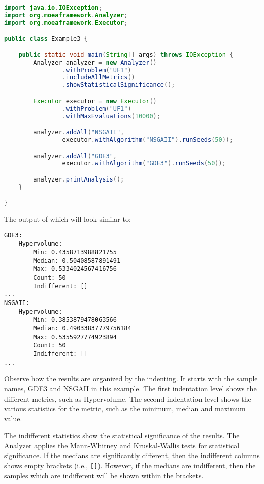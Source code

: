 \begin{lstlisting}[language=Java]
import java.io.IOException;
import org.moeaframework.Analyzer;
import org.moeaframework.Executor;

public class Example3 {

	public static void main(String[] args) throws IOException {
		Analyzer analyzer = new Analyzer()
				.withProblem("UF1")
				.includeAllMetrics()
				.showStatisticalSignificance();

		Executor executor = new Executor()
				.withProblem("UF1")
				.withMaxEvaluations(10000);

		analyzer.addAll("NSGAII",  
				executor.withAlgorithm("NSGAII").runSeeds(50));

		analyzer.addAll("GDE3",
				executor.withAlgorithm("GDE3").runSeeds(50));

		analyzer.printAnalysis();
	}

}
\end{lstlisting}

The output of which will look similar to:

\begin{lstlisting}[language=Plaintext]
GDE3:
    Hypervolume:
        Min: 0.4358713988821755
        Median: 0.50408587891491
        Max: 0.5334024567416756
        Count: 50
        Indifferent: []
...
NSGAII:
    Hypervolume:
        Min: 0.3853879478063566
        Median: 0.49033837779756184
        Max: 0.5355927774923894
        Count: 50
        Indifferent: []
...
\end{lstlisting}

Observe how the results are organized by the indenting.  It starts with the sample names, GDE3 and NSGAII in this example.  The first indentation level shows the different metrics, such as Hypervolume.  The second indentation level shows the various statistics for the metric, such as the minimum, median and maximum value.

The indifferent statistics show the statistical significance of the results.  The Analyzer applies the Mann-Whitney and Kruskal-Wallis tests for statistical significance.  If the medians are significantly different, then the indifferent columns shows empty brackets (i.e., \texttt{[]}).  However, if the medians are indifferent, then the samples which are indifferent will be shown within the brackets.

